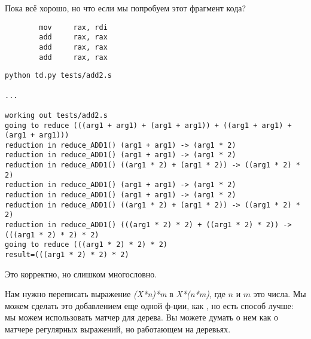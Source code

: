 Пока всё хорошо, но что если мы попробуем этот фрагмент кода?

\begin{lstlisting}
        mov     rax, rdi
        add     rax, rax
        add     rax, rax
        add     rax, rax
\end{lstlisting}

\begin{lstlisting}
python td.py tests/add2.s

...

working out tests/add2.s
going to reduce (((arg1 + arg1) + (arg1 + arg1)) + ((arg1 + arg1) + (arg1 + arg1)))
reduction in reduce_ADD1() (arg1 + arg1) -> (arg1 * 2)
reduction in reduce_ADD1() (arg1 + arg1) -> (arg1 * 2)
reduction in reduce_ADD1() ((arg1 * 2) + (arg1 * 2)) -> ((arg1 * 2) * 2)
reduction in reduce_ADD1() (arg1 + arg1) -> (arg1 * 2)
reduction in reduce_ADD1() (arg1 + arg1) -> (arg1 * 2)
reduction in reduce_ADD1() ((arg1 * 2) + (arg1 * 2)) -> ((arg1 * 2) * 2)
reduction in reduce_ADD1() (((arg1 * 2) * 2) + ((arg1 * 2) * 2)) -> (((arg1 * 2) * 2) * 2)
going to reduce (((arg1 * 2) * 2) * 2)
result=(((arg1 * 2) * 2) * 2)
\end{lstlisting}

Это корректно, но слишком многословно.

Нам нужно переписать выражение \textit{(X*n)*m} в \textit{X*(n*m)}, где $n$ и $m$ это числа.
Мы можем сделать это добавлением еще одной ф-ции, как , но есть способ лучше:
мы можем использовать матчер для дерева.
Вы можете думать о нем как о матчере регулярных выражений, но работающем на деревьях.

